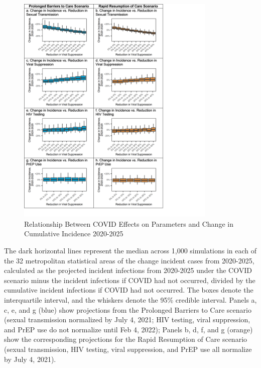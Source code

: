 \documentclass{article}
\begin{document}
\begin{figure}[H]
	\caption{Relationship Between COVID Effects on Parameters and Change in Cumulative Incidence 2020-2025}
	\includegraphics[width=0.85\textwidth]{images/figure_s5}
\end{figure}
The dark horizontal lines represent the median across 1,000 simulations in each of the 32 metropolitan statistical areas of the change incident cases from 2020-2025, calculated as the projected incident infections from 2020-2025 under the COVID scenario minus the incident infections if COVID had not occurred, divided by the cumulative incident infections if COVID had not occurred. The boxes denote the interquartile interval, and the whiskers denote the 95\% credible interval. Panels a, c, e, and g (blue) show projections from the Prolonged Barriers to Care scenario (sexual transmission normalized by July 4, 2021; HIV testing, viral suppression, and PrEP use do not normalize until Feb 4, 2022); Panels b, d, f, and g (orange) show the corresponding projections for the Rapid Resumption of Care scenario (sexual transmission, HIV testing, viral suppression, and PrEP use all normalize by July 4, 2021).
\end{document}
